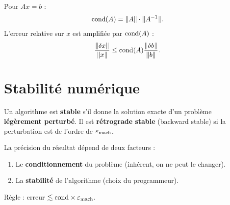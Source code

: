 \begin{definition}
Pour $Ax=b$ :
\[
\mathrm{cond}(A) = \|A\|\cdot\|A^{-1}\|.
\]
L'erreur relative sur $x$ est amplifi\'ee par $\mathrm{cond}(A)$ :
\[
\frac{\|\delta x\|}{\|x\|} \leq \mathrm{cond}(A)\frac{\|\delta b\|}{\|b\|}.
\]
\end{definition}

\section{Stabilit\'e num\'erique}

\begin{definition}
Un algorithme est \textbf{stable} s'il donne la solution exacte d'un probl\`eme \textbf{l\'eg\`erement perturb\'e}. Il est \textbf{r\'etrograde stable} (backward stable) si la perturbation est de l'ordre de $\varepsilon_{\mathrm{mach}}$.
\end{definition}

\begin{methode}
La pr\'ecision du r\'esultat d\'epend de deux facteurs :
\begin{enumerate}
\item Le \textbf{conditionnement} du probl\`eme (inh\'erent, on ne peut le changer).
\item La \textbf{stabilit\'e} de l'algorithme (choix du programmeur).
\end{enumerate}
R\`egle : erreur $\lesssim \mathrm{cond} \times \varepsilon_{\mathrm{mach}}$.
\end{methode}

\begin{center}
\end{center}

